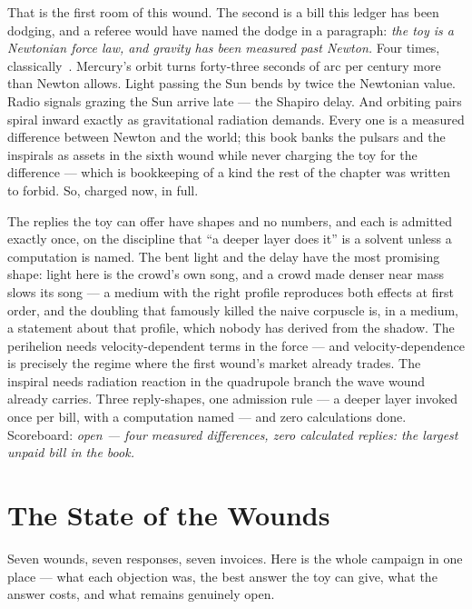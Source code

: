\documentclass[fontsize=11pt,paper=a4,pagesize=auto,parskip=half-]{scrbook}
\begin{document}
That is the first room of this wound. The second is a bill this ledger has been dodging, and a referee would have named the dodge in a paragraph: \emph{the toy is a Newtonian force law, and gravity has been measured past Newton.} Four times, classically~\cite{will2014}. Mercury's orbit turns forty-three seconds of arc per century more than Newton allows. Light passing the Sun bends by twice the Newtonian value. Radio signals grazing the Sun arrive late --- the Shapiro delay. And orbiting pairs spiral inward exactly as gravitational radiation demands. Every one is a measured difference between Newton and the world; this book banks the pulsars and the inspirals as assets in the sixth wound while never charging the toy for the difference --- which is bookkeeping of a kind the rest of the chapter was written to forbid. So, charged now, in full.

The replies the toy can offer have shapes and no numbers, and each is admitted exactly once, on the discipline that ``a deeper layer does it'' is a solvent unless a computation is named. The bent light and the delay have the most promising shape: light here is the crowd's own song, and a crowd made denser near mass slows its song --- a medium with the right profile reproduces both effects at first order, and the doubling that famously killed the naive corpuscle is, in a medium, a statement about that profile, which nobody has derived from the shadow. The perihelion needs velocity-dependent terms in the force --- and velocity-dependence is precisely the regime where the first wound's market already trades. The inspiral needs radiation reaction in the quadrupole branch the wave wound already carries. Three reply-shapes, one admission rule --- a deeper layer invoked once per bill, with a computation named --- and zero calculations done. Scoreboard: \emph{open --- four measured differences, zero calculated replies: the largest unpaid bill in the book.}

\section{The State of the Wounds}

Seven wounds, seven responses, seven invoices. Here is the whole campaign in one place --- what each objection was, the best answer the toy can give, what the answer costs, and what remains genuinely open.
\end{document}
